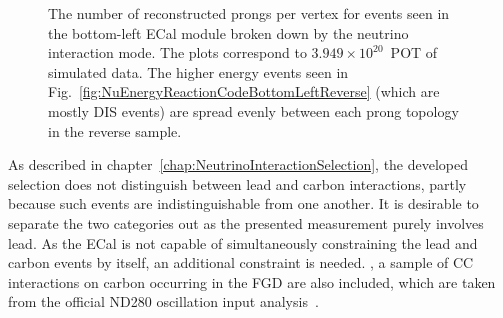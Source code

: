 \begin{figure}%
  \centering
  \hspace{1em}
  \caption{The number of reconstructed prongs per vertex for events seen in the bottom-left ECal module broken down by the neutrino interaction mode. The plots correspond to $3.949\times 10^{20}$~POT of simulated data.  The higher energy events seen in Fig.~\ref{fig:NuEnergyReactionCodeBottomLeftReverse} (which are mostly DIS events) are spread evenly between each prong topology in the reverse sample.}
  \label{fig:NProngsReactionCodeBottomLeft}
\end{figure}
\newline
\newline
As described in chapter~\ref{chap:NeutrinoInteractionSelection}, the developed selection does not distinguish between lead and carbon interactions, partly because such events are indistinguishable from one another.  It is desirable to separate the two categories out as the presented measurement purely involves lead.  As the ECal is not capable of simultaneously constraining the lead and carbon events by itself, an additional constraint is needed.  , a sample of CC interactions on carbon occurring in the FGD are also included, which are taken from the official ND280 oscillation input analysis~\cite{CCIncSelFGDTN}.
